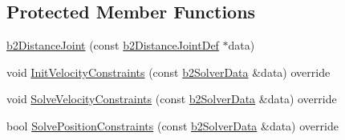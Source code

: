 \subsection*{Protected Member Functions}
\begin{DoxyCompactItemize}
\item 
\mbox{\hyperlink{classb2_distance_joint_ad2bb6de92a47868629a7397e23256454}{b2\+Distance\+Joint}} (const \mbox{\hyperlink{structb2_distance_joint_def}{b2\+Distance\+Joint\+Def}} $\ast$data)
\item 
void \mbox{\hyperlink{classb2_distance_joint_abe956dd5951651b36321098416ad99fd}{Init\+Velocity\+Constraints}} (const \mbox{\hyperlink{structb2_solver_data}{b2\+Solver\+Data}} \&data) override
\item 
void \mbox{\hyperlink{classb2_distance_joint_ad42429151fb979a230f103d684d2a42c}{Solve\+Velocity\+Constraints}} (const \mbox{\hyperlink{structb2_solver_data}{b2\+Solver\+Data}} \&data) override
\item 
bool \mbox{\hyperlink{classb2_distance_joint_a431d12fac5ee9f6a5637321ee28119bc}{Solve\+Position\+Constraints}} (const \mbox{\hyperlink{structb2_solver_data}{b2\+Solver\+Data}} \&data) override
\end{DoxyCompactItemize}
